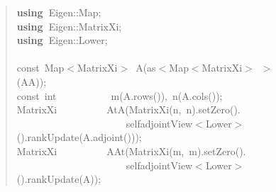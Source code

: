 \documentclass[shortnames,article]{jss}
\newcommand{\hlstd}[1]{\textcolor[rgb]{0,0,0}{#1}}
\newcommand{\hlopt}[1]{\textcolor[rgb]{0,0,0}{#1}}
\newcommand{\hlkwa}[1]{\textcolor[rgb]{0.61,0.13,0.93}{\bf{#1}}}
\newcommand{\hlkwb}[1]{\textcolor[rgb]{0.13,0.54,0.13}{#1}}
\newcommand{\hlkwd}[1]{\textcolor[rgb]{0,0,0}{#1}}
\begin{document}
\begin{figure}[htb]
  \begin{quote}
    \noindent
    \ttfamily
    \hlstd{}\hlkwa{using\ }\hlstd{Eigen}\hlopt{::}\hlstd{Map}\hlopt{;}\hspace*{\fill}\\
    \hlstd{}\hlkwa{using\ }\hlstd{Eigen}\hlopt{::}\hlstd{MatrixXi}\hlopt{;}\hspace*{\fill}\\
    \hlstd{}\hlkwa{using\ }\hlstd{Eigen}\hlopt{::}\hlstd{Lower}\hlopt{;}\hspace*{\fill}\\
    \hlstd{}\hspace*{\fill}\\
    \hlkwb{const\ }\hlstd{Map}\hlopt{$<$}\hlstd{MatrixXi}\hlopt{$>$\ }\hlstd{}\hlkwd{A}\hlstd{}\hlopt{(}\hlstd{as}\hlopt{$<$}\hlstd{Map}\hlopt{$<$}\hlstd{MatrixXi}\hlopt{$>$\ $>$(}\hlstd{AA}\hlopt{));}\hspace*{\fill}\\
    \hlstd{}\hlkwb{const\ int}\hlstd{\ \ \ \ \ \ \ \ \ \ \ }\hlkwb{}\hlstd{}\hlkwd{m}\hlstd{}\hlopt{(}\hlstd{A}\hlopt{.}\hlstd{}\hlkwd{rows}\hlstd{}\hlopt{()),\ }\hlstd{}\hlkwd{n}\hlstd{}\hlopt{(}\hlstd{A}\hlopt{.}\hlstd{}\hlkwd{cols}\hlstd{}\hlopt{());}\hspace*{\fill}\\
    \hlstd{MatrixXi}\hlstd{\ \ \ \ \ \ \ \ \ \ }\hlstd{}\hlkwd{AtA}\hlstd{}\hlopt{(}\hlstd{}\hlkwd{MatrixXi}\hlstd{}\hlopt{(}\hlstd{n}\hlopt{,\ }\hlstd{n}\hlopt{).}\hlstd{}\hlkwd{setZero}\hlstd{}\hlopt{().}\hspace*{\fill}\\
    \hlstd{}\hlstd{\ \ \ \ \ \ \ \ \ \ \ \ \ \ \ \ \ \ \ \ \ \ }\hlstd{selfadjointView}\hlopt{$<$}\hlstd{Lower}\hlopt{$>$().}\hlstd{}\hlkwd{rankUpdate}\hlstd{}\hlopt{(}\hlstd{A}\hlopt{.}\hlstd{}\hlkwd{adjoint}\hlstd{}\hlopt{()));}\hspace*{\fill}\\
    \hlstd{MatrixXi}\hlstd{\ \ \ \ \ \ \ \ \ \ }\hlstd{}\hlkwd{AAt}\hlstd{}\hlopt{(}\hlstd{}\hlkwd{MatrixXi}\hlstd{}\hlopt{(}\hlstd{m}\hlopt{,\ }\hlstd{m}\hlopt{).}\hlstd{}\hlkwd{setZero}\hlstd{}\hlopt{().}\hspace*{\fill}\\
    \hlstd{}\hlstd{\ \ \ \ \ \ \ \ \ \ \ \ \ \ \ \ \ \ \ \ \ \ }\hlstd{selfadjointView}\hlopt{$<$}\hlstd{Lower}\hlopt{$>$().}\hlstd{}\hlkwd{rankUpdate}\hlstd{}\hlopt{(}\hlstd{A}\hlopt{));}\hspace*{\fill}\\

\end{quote}
\end{figure}
\end{document}

